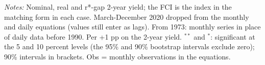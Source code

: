 \begin{table}[tp]
{\begin{tabular}{llcrrrrrrr}
\bottomrule\end{tabular}}
\begin{flushleft}\footnotesize\textit{Notes:} Nominal, real and r*-gap 2-year yield; the FCI is the index in the matching form in each case. March-December 2020 dropped from the monthly and daily equations (values still enter as lags). From 1973: monthly series in place of daily data before 1990. Per +1 pp on the 2-year yield. $^{**}$ and $^{*}$: significant at the 5 and 10 percent levels (the 95\% and 90\% bootstrap intervals exclude zero); 90\% intervals in brackets. Obs = monthly observations in the equations.\end{flushleft}
\end{table}
